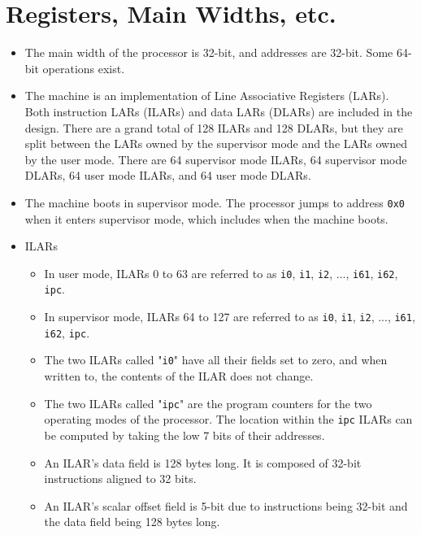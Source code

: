 \documentclass{article}
\begin{document}
\section{Registers, Main Widths, etc.}
	\begin{itemize}
	\item The main width of the processor is 32-bit, and addresses are
	32-bit.  Some 64-bit operations exist.

	\item The machine is an implementation of Line Associative Registers
	(LARs).  Both instruction LARs (ILARs) and data LARs (DLARs) are
	included in the design.  There are a grand total of 128 ILARs and 128
	DLARs, but they are split between the LARs owned by the supervisor
	mode and the LARs owned by the user mode.  There are 64 supervisor mode
	ILARs, 64 supervisor mode DLARs, 64 user mode ILARs, and 64 user mode
	DLARs.

	\item The machine boots in supervisor mode.  The processor jumps to
	address \texttt{0x0} when it enters supervisor mode, which includes
	when the machine boots.

	\item ILARs
		\begin{itemize}
		\item In user mode, ILARs 0 to 63 are referred to as \texttt{i0},
		\texttt{i1}, \texttt{i2}, ..., \texttt{i61}, \texttt{i62},
		\texttt{ipc}.

		\item In supervisor mode, ILARs 64 to 127 are referred to as
		\texttt{i0}, \texttt{i1}, \texttt{i2}, ..., \texttt{i61},
		\texttt{i62}, \texttt{ipc}.

		\item The two ILARs called "\texttt{i0}" have all their
		fields set to zero, and when written to, the contents of the ILAR
		does not change.

		\item The two ILARs called "\texttt{ipc}" are the program
		counters for the two operating modes of the processor.  The
		location within the \texttt{ipc} ILARs can be computed by taking
		the low 7 bits of their addresses.

		\item An ILAR's data field is 128 bytes long.  It is composed of
		32-bit instructions aligned to 32 bits.

		\item An ILAR's scalar offset field is 5-bit due to instructions
		being 32-bit and the data field being 128 bytes long.


\end{itemize}
\end{itemize}
\end{document}
